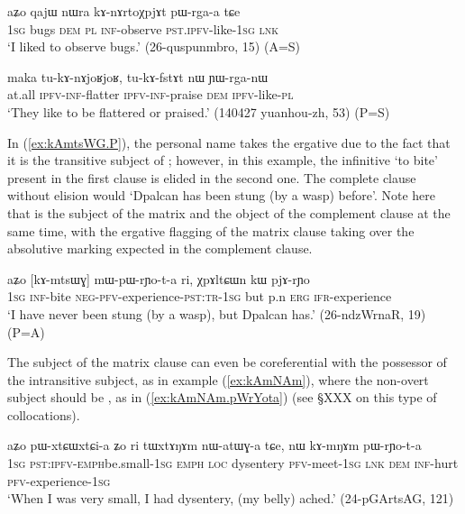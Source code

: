    \begin{exe}
   \ex   \label{ex:kAnArtoXpjAt.pWrgaa} 
\gll aʑo qajɯ nɯra kɤ-nɤrtoχpjɤt pɯ-rga-a tɕe  	\\
  	\textsc{1sg} bugs \textsc{dem} \textsc{pl} \textsc{inf}-observe \textsc{pst.ipfv}-like-\textsc{1sg} \textsc{lnk}  \\
 \glt `I liked to observe bugs.' (26-quspunmbro, 15) (A=S)
     \end{exe}  
 
  \begin{exe}
   \ex   \label{ex:YWrganW} 
\gll maka tu-kɤ-nɤjoʁjoʁ, tu-kɤ-fstɤt nɯ ɲɯ-rga-nɯ  \\
at.all \textsc{ipfv-inf}-flatter \textsc{ipfv-inf}-praise \textsc{dem} \textsc{ipfv}-like-\textsc{pl} \\
\glt `They like to be flattered or praised.' (140427 yuanhou-zh, 53) (P=S)
    \end{exe}  
    
In (\ref{ex:kAmtsWG.P}), the personal name  takes the ergative due to the fact that it is the transitive subject of ; however, in this example, the infinitive  `to bite' present in the first clause is elided in the second one. The complete clause without elision would  `Dpalcan has been stung (by a wasp) before'. Note here that  is the subject of the matrix and the object of the complement clause at the same time, with the ergative flagging of the matrix clause taking over the absolutive marking expected in the complement clause.

      \begin{exe}
   \ex   \label{ex:kAmtsWG.P} 
\gll aʑo [kɤ-mtsɯɣ] mɯ-pɯ-rɲo-t-a ri, χpɤltɕɯn kɯ pjɤ-rɲo  \\
\textsc{1sg} \textsc{inf}-bite \textsc{neg-pfv}-experience-\textsc{pst:tr-1sg} but p.n \textsc{erg}  \textsc{ifr}-experience \\
\glt `I have never been stung (by a wasp), but Dpalcan has.' (26-ndzWrnaR, 19) (P=A)
    \end{exe}  

The subject of the matrix clause can even be coreferential with the possessor of the intransitive subject, as in example (\ref{ex:kAmNAm}), where the non-overt subject should be , as in (\ref{ex:kAmNAm.pWrYota}) (see §XXX on this type of collocations).
 
 \begin{exe}
\ex \label{ex:kAmNAm}
\gll aʑo pɯ-xtɕɯ\redp{}xtɕi-a ʑo ri tɯxtɤŋɤm nɯ-atɯɣ-a tɕe, nɯ kɤ-mŋɤm pɯ-rɲo-t-a \\
\textsc{1sg} \textsc{pst:ipfv-emph}\redp{}be.small-\textsc{1sg} \textsc{emph} \textsc{loc} dysentery \textsc{pfv}-meet-\textsc{1sg} \textsc{lnk} \textsc{dem} \textsc{inf}-hurt \textsc{pfv}-experience-\textsc{1sg} \\
\glt `When I was very small, I had dysentery, (my belly) ached.'  (24-pGArtsAG, 121)
\end{exe}

